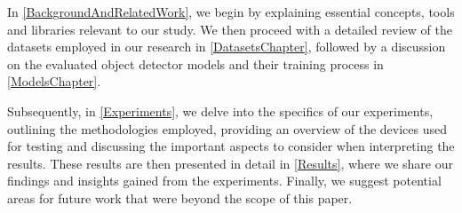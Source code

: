 In \autoref{BackgroundAndRelatedWork}, we begin by explaining essential
concepts, tools and libraries relevant to our study. We then proceed with a
detailed review of the datasets employed in our research in
\autoref{DatasetsChapter}, followed by a discussion on the evaluated object
detector models and their training process in \autoref{ModelsChapter}.

Subsequently, in \autoref{Experiments}, we delve into the specifics of our
experiments, outlining the methodologies employed, providing an overview of the
devices used for testing and discussing the important aspects to consider when
interpreting the results. These results are then presented in detail in
\autoref{Results}, where we share our findings and insights gained from the
experiments. Finally, we suggest potential areas for future work that were
beyond the scope of this paper.



